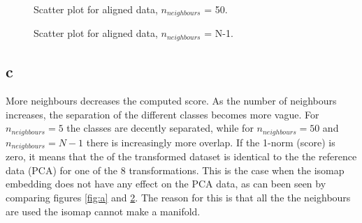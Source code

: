 \documentclass[a4paper,12pt]{article}
\begin{document}
\begin{figure}[H]
\hfill
{}
\hfill
\caption{Scatter plot for aligned data, $n_{neighbours}$ = 50.}
\label{52}
\end{figure}

\begin{figure}[H]
\hfill
{}
\hfill
\caption{Scatter plot for aligned data, $n_{neighbours}$ = N-1. }
\label{53}
\end{figure}
\subsection{c}
More neighbours decreases the computed score. As the number of neighbours increases, the separation of the different classes becomes more vague. For $n_{neighbours}=5$ the classes are decently separated, while for $n_{neighbours}=50$ and $n_{neighbours}=N-1$ there is increasingly more overlap. If the 1-norm (score) is zero, it means that the of the transformed dataset is identical to the the reference data (PCA) for one of the 8 transformations.
This is the case when the isomap embedding does not have any effect on the PCA data, as can been seen by comparing figures \ref{fig:a} and \ref{53}. The reason for this is that  all the the neighbours are used the isomap cannot make a manifold. 
\end{document}
